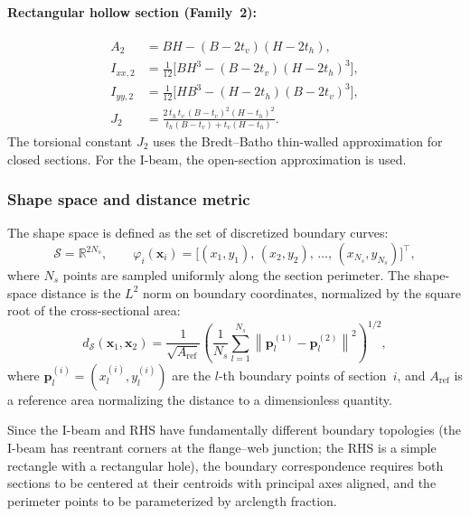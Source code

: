 \paragraph{Rectangular hollow section (Family~2):}
\begin{subequations}
\label{eq:rhs_properties}
\begin{align}
    A_2 &= BH - (B - 2t_v)(H - 2t_h), \\
    I_{xx,2} &= \tfrac{1}{12}\bigl[ B H^3 - (B - 2t_v)(H - 2t_h)^3 \bigr], \\
    I_{yy,2} &= \tfrac{1}{12}\bigl[ H B^3 - (H - 2t_h)(B - 2t_v)^3 \bigr], \\
    J_2 &= \frac{2\, t_h\, t_v\, (B - t_v)^2 (H - t_h)^2}{t_h(B - t_v) + t_v(H - t_h)}.
\end{align}
\end{subequations}
The torsional constant $J_2$ uses the Bredt--Batho thin-walled approximation for closed sections. For the I-beam, the open-section approximation is used.


\subsubsection{Shape space and distance metric}

The shape space is defined as the set of discretized boundary curves:
\begin{equation}
    \mathcal{S} = \mathbb{R}^{2N_s}, \qquad
    \varphi_i(\mathbf{x}_i) = \bigl[(x_1, y_1),\, (x_2, y_2),\, \ldots,\, (x_{N_s}, y_{N_s})\bigr]^\top,
\end{equation}
where $N_s$ points are sampled uniformly along the section perimeter. The shape-space distance is the $L^2$ norm on boundary coordinates, normalized by the square root of the cross-sectional area:
\begin{equation}
    d_{\mathcal{S}}(\mathbf{x}_1, \mathbf{x}_2)
    = \frac{1}{\sqrt{A_{\mathrm{ref}}}} \left( \frac{1}{N_s} \sum_{l=1}^{N_s}
    \left\| \mathbf{p}_l^{(1)} - \mathbf{p}_l^{(2)} \right\|^2 \right)^{1/2},
    \label{eq:section_distance}
\end{equation}
where $\mathbf{p}_l^{(i)} = (x_l^{(i)}, y_l^{(i)})$ are the $l$-th boundary points of section~$i$, and $A_{\mathrm{ref}}$ is a reference area normalizing the distance to a dimensionless quantity.

\begin{remark}
Since the I-beam and RHS have fundamentally different boundary topologies (the I-beam has reentrant corners at the flange--web junction; the RHS is a simple rectangle with a rectangular hole), the boundary correspondence requires both sections to be centered at their centroids with principal axes aligned, and the perimeter points to be parameterized by arclength fraction.
\end{remark}


